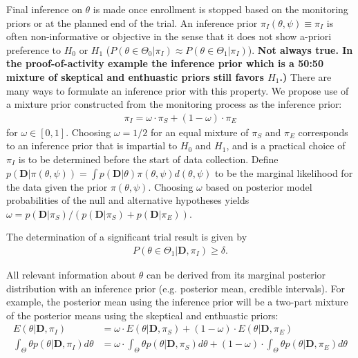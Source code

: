 \documentclass[12pt]{article}
\begin{document}
Final inference on $\theta$ is made once enrollment is stopped based on the monitoring priors or at the planned end of the trial. An inference prior $\pi_{I}(\theta,\psi)\equiv\pi_{I}$ is often non-informative or objective in the sense that it does not show a-priori preference to $H_0$ or $H_1$ ($P(\theta\in\Theta_0|\pi_I)\approx P(\theta\in\Theta_1|\pi_I)$). \textbf{Not always true. In the proof-of-activity example the inference prior which is a 50:50 mixture of skeptical and enthuastic priors still favors $H_1$.)} There are many ways to formulate an inference prior with this property. We propose use of a mixture prior constructed from the monitoring process as the inference prior:
\begin{align*}
\pi_{I}=\omega\cdot\pi_{S}+(1-\omega)\cdot\pi_E
\end{align*}
for $\omega\in[0,1]$. Choosing $\omega=1/2$ for an equal mixture of $\pi_S$ and $\pi_E$ corresponds to an inference prior that is impartial to $H_0$ and $H_1$, and is a practical choice of $\pi_I$ is to be determined before the start of data collection. Define $p(\mathbf{D}|\pi(\theta,\psi))=\int p(\mathbf{D}|\theta)\pi(\theta,\psi)d(\theta,\psi)$ to be the marginal likelihood for the data given the prior $\pi(\theta,\psi)$. Choosing $\omega$ based on posterior model probabilities of the null and alternative hypotheses yields $\omega=p(\mathbf{D}| \pi_{S})/(p(\mathbf{D}| \pi_{S})+p(\mathbf{D}| \pi_{E}))$. 

The determination of a significant trial result is given by
\begin{align*}
P(\theta\in\Theta_1|\mathbf{D},\pi_I)\geq\delta.
\end{align*} 

All relevant information about $\theta$ can be derived from its marginal posterior distribution with an inference prior (e.g. posterior mean, credible intervals). For example, the posterior mean using the inference prior will be a two-part mixture of the posterior means using the skeptical and enthuastic priors:
\begin{align*}
E(\theta|\mathbf{D},\pi_I)&=\omega\cdot E(\theta|\mathbf{D}, \pi_{S})+(1-\omega)\cdot E(\theta|\mathbf{D}, \pi_{E})\\
\int_\Theta \theta p(\theta|\mathbf{D},\pi_{I})d\theta&=\omega\cdot \int_\Theta \theta p(\theta|\mathbf{D},\pi_{S})d\theta+(1-\omega)\cdot\int_\Theta \theta p(\theta|\mathbf{D},\pi_{E})d\theta
\end{align*}
\end{document}
